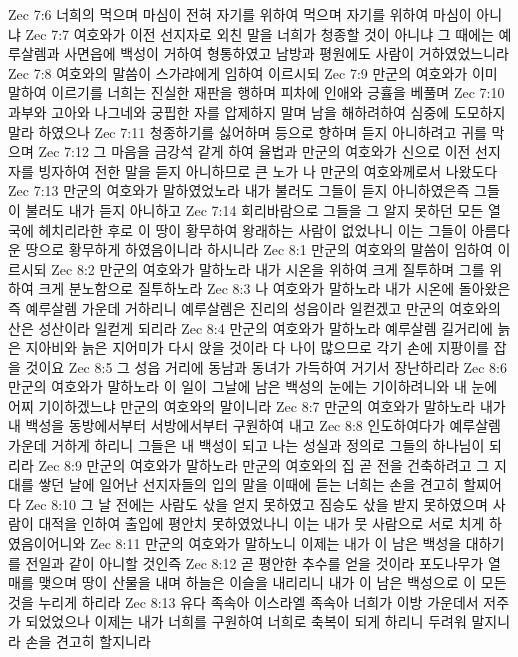 Zec 7:6  너희의 먹으며 마심이 전혀 자기를 위하여 먹으며 자기를 위하여 마심이 아니냐
Zec 7:7  여호와가 이전 선지자로 외친 말을 너희가 청종할 것이 아니냐 그 때에는 예루살렘과 사면읍에 백성이 거하여 형통하였고 남방과 평원에도 사람이 거하였었느니라
Zec 7:8  여호와의 말씀이 스가랴에게 임하여 이르시되
Zec 7:9  만군의 여호와가 이미 말하여 이르기를 너희는 진실한 재판을 행하며 피차에 인애와 긍휼을 베풀며
Zec 7:10  과부와 고아와 나그네와 궁핍한 자를 압제하지 말며 남을 해하려하여 심중에 도모하지 말라 하였으나
Zec 7:11  청종하기를 싫어하며 등으로 향하며 듣지 아니하려고 귀를 막으며
Zec 7:12  그 마음을 금강석 같게 하여 율법과 만군의 여호와가 신으로 이전 선지자를 빙자하여 전한 말을 듣지 아니하므로 큰 노가 나 만군의 여호와께로서 나왔도다
Zec 7:13  만군의 여호와가 말하였었노라 내가 불러도 그들이 듣지 아니하였은즉 그들이 불러도 내가 듣지 아니하고
Zec 7:14  회리바람으로 그들을 그 알지 못하던 모든 열국에 헤치리라한 후로 이 땅이 황무하여 왕래하는 사람이 없었나니 이는 그들이 아름다운 땅으로 황무하게 하였음이니라 하시니라
Zec 8:1  만군의 여호와의 말씀이 임하여 이르시되
Zec 8:2  만군의 여호와가 말하노라 내가 시온을 위하여 크게 질투하며 그를 위하여 크게 분노함으로 질투하노라
Zec 8:3  나 여호와가 말하노라 내가 시온에 돌아왔은즉 예루살렘 가운데 거하리니 예루살렘은 진리의 성읍이라 일컫겠고 만군의 여호와의 산은 성산이라 일컫게 되리라
Zec 8:4  만군의 여호와가 말하노라 예루살렘 길거리에 늙은 지아비와 늙은 지어미가 다시 앉을 것이라 다 나이 많으므로 각기 손에 지팡이를 잡을 것이요
Zec 8:5  그 성읍 거리에 동남과 동녀가 가득하여 거기서 장난하리라
Zec 8:6  만군의 여호와가 말하노라 이 일이 그날에 남은 백성의 눈에는 기이하려니와 내 눈에 어찌 기이하겠느냐 만군의 여호와의 말이니라
Zec 8:7  만군의 여호와가 말하노라 내가 내 백성을 동방에서부터 서방에서부터 구원하여 내고
Zec 8:8  인도하여다가 예루살렘 가운데 거하게 하리니 그들은 내 백성이 되고 나는 성실과 정의로 그들의 하나님이 되리라
Zec 8:9  만군의 여호와가 말하노라 만군의 여호와의 집 곧 전을 건축하려고 그 지대를 쌓던 날에 일어난 선지자들의 입의 말을 이때에 듣는 너희는 손을 견고히 할찌어다
Zec 8:10  그 날 전에는 사람도 삯을 얻지 못하였고 짐승도 삯을 받지 못하였으며 사람이 대적을 인하여 출입에 평안치 못하였었나니 이는 내가 뭇 사람으로 서로 치게 하였음이어니와
Zec 8:11  만군의 여호와가 말하노니 이제는 내가 이 남은 백성을 대하기를 전일과 같이 아니할 것인즉
Zec 8:12  곧 평안한 추수를 얻을 것이라 포도나무가 열매를 맺으며 땅이 산물을 내며 하늘은 이슬을 내리리니 내가 이 남은 백성으로 이 모든 것을 누리게 하리라
Zec 8:13  유다 족속아 이스라엘 족속아 너희가 이방 가운데서 저주가 되었었으나 이제는 내가 너희를 구원하여 너희로 축복이 되게 하리니 두려워 말지니라 손을 견고히 할지니라
